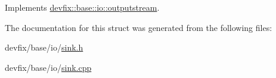 Implements \hyperlink{structdevfix_1_1base_1_1io_1_1outputstream_ac7e5fcd6883c7c8f53356a4eb8284c00}{devfix\+::base\+::io\+::outputstream}.



The documentation for this struct was generated from the following files\+:\begin{DoxyCompactItemize}
\item 
devfix/base/io/\hyperlink{sink_8h}{sink.\+h}\item 
devfix/base/io/\hyperlink{sink_8cpp}{sink.\+cpp}\end{DoxyCompactItemize}
